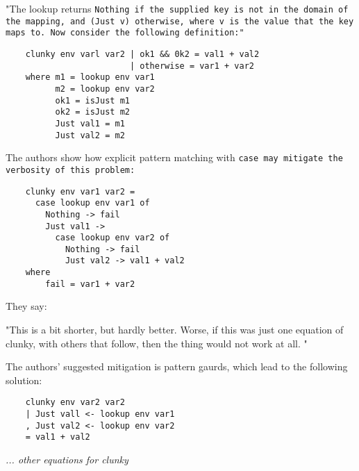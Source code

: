 \documentclass[manuscript,screen,review, 12pt]{acmart}
\begin{document}
"The lookup returns \tt{Nothing} if the supplied key is not in the domain of the
mapping, and (\tt{Just v}) otherwise, where v is the value that the key maps to.
Now consider the following definition:"

\begin{verbatim}
    clunky env varl var2 | ok1 && 0k2 = val1 + val2 
                         | otherwise = var1 + var2 
    where m1 = lookup env var1 
          m2 = lookup env var2
          ok1 = isJust m1 
          ok2 = isJust m2 
          Just val1 = m1 
          Just val2 = m2    
\end{verbatim}


The authors show how explicit pattern matching with \tt{case} may mitigate the
verbosity of this problem:

\begin{verbatim}
    clunky env var1 var2 = 
      case lookup env var1 of 
        Nothing -> fail 
        Just val1 -> 
          case lookup env var2 of 
            Nothing -> fail 
            Just val2 -> val1 + val2
    where 
        fail = var1 + var2
\end{verbatim}

They say: 

"This is a bit shorter, but hardly better. Worse, if this was just one equation
of clunky, with others that follow, then the thing would not work at all. " 

The authors' suggested mitigation is pattern gaurds, which lead to the following
solution: 
\begin{center}
\begin{verbatim}
    clunky env var2 var2    
    | Just vall <- lookup env var1
    , Just val2 <- lookup env var2
    = val1 + val2
\end{verbatim}
\it{... other equations for clunky}
\end{center}    
\end{document}
